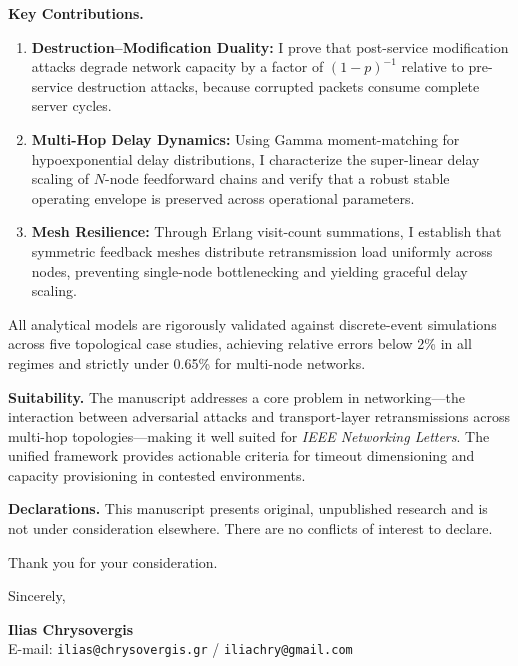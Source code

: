 \documentclass[11pt]{article}
\begin{document}
\vspace{0.4em}
\noindent
\textbf{Key Contributions.}
\begin{enumerate}
    \setlength{\itemsep}{2pt}
    \setlength{\parskip}{0pt}
    \item \textbf{Destruction--Modification Duality:} I prove that post-service modification attacks degrade network capacity by a factor of $(1-p)^{-1}$ relative to pre-service destruction attacks, because corrupted packets consume complete server cycles.
    \item \textbf{Multi-Hop Delay Dynamics:} Using Gamma moment-matching for hypoexponential delay distributions, I characterize the super-linear delay scaling of $N$-node feedforward chains and verify that a robust stable operating envelope is preserved across operational parameters.
    \item \textbf{Mesh Resilience:} Through Erlang visit-count summations, I establish that symmetric feedback meshes distribute retransmission load uniformly across nodes, preventing single-node bottlenecking and yielding graceful delay scaling.
\end{enumerate}
All analytical models are rigorously validated against discrete-event simulations across five topological case studies, achieving relative errors below 2\% in all regimes and strictly under 0.65\% for multi-node networks.

\vspace{0.4em}
\noindent
\textbf{Suitability.}
The manuscript addresses a core problem in networking---the interaction between adversarial attacks and transport-layer retransmissions across multi-hop topologies---making it well suited for \textit{IEEE Networking Letters}. The unified framework provides actionable criteria for timeout dimensioning and capacity provisioning in contested environments.

\vspace{0.4em}
\noindent
\textbf{Declarations.}
This manuscript presents original, unpublished research and is not under consideration elsewhere. There are no conflicts of interest to declare.

\vspace{0.8em}

\noindent
Thank you for your consideration.

\vspace{0.8em}

\noindent
Sincerely,

\vspace{0.6em}
\noindent
\textbf{Ilias Chrysovergis} \\
E-mail: \texttt{ilias@chrysovergis.gr} / \texttt{iliachry@gmail.com}
\end{document}
